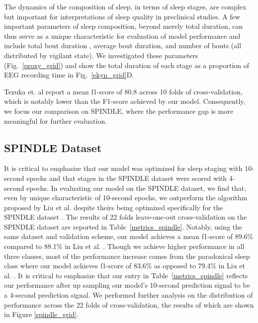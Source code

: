 \documentclass[pdflatex,sn-mathphys-num]{sn-jnl}%
\theoremstyle{thmstyleone}%
\theoremstyle{thmstyletwo}%
\theoremstyle{thmstylethree}%
\newcommand{\liuf}{88.1}
\newcommand{\liufp}{79.4}
\newcommand{\spindlefscore}{89.6}
\newcommand{\spindlefscorep}{83.6}
\begin{document}
The dynamics of the composition of sleep, in terms of sleep stages, are complex but important for interpretations of sleep quality in preclinical studies. A few important parameters of sleep composition, beyond merely total duration, can thus serve as a unique characteristic for evaluation of model performance and include total bout duration , average bout duration, and number of bouts (all distributed by vigilant state). We investigated these parameters (Fig.~\ref{proxy_grid}) and show the total duration of each stage as a proportion of EEG recording time in Fig.~\ref{ekyn_grid}D.  

Tezuka et. al \cite{tezuka_real-time_2021} report a mean f1-score of 80.8 across 10 folds of cross-validation, which is notably lower than the F1-score achieved by our model. Consequently, we focus our comparison on SPINDLE, where the performance gap is more meaningful for further evaluation.

\subsection*{SPINDLE Dataset}
It is critical to emphasize that our model was optimized for sleep staging with 10-second epochs and that stages in the SPINDLE dataset were scored with 4-second epochs. In evaluating our model on the SPINDLE dataset, we find that, even by unique characteristic of 10-second epochs, we outperform the algorithm proposed by Liu et al. \cite{liu_attention-based_2022} despite theirs being optimized specifically for the SPINDLE dataset .
The results of 22 folds leave-one-out cross-validation on the SPINDLE dataset are reported in Table~\ref{metrics_spindle}. Notably, using the same dataset and validation scheme, our model achieves a mean f1-score of \spindlefscore\% compared to \liuf\% in Liu et al. \cite{liu_attention-based_2022}. Though we achieve higher performance in all three classes, most of the performance increase comes from the paradoxical sleep class where our model achieves f1-score of \spindlefscorep\% as opposed to \liufp\% in Liu et al. \cite{liu_attention-based_2022}. It is critical to emphasize that our entry in Table~\ref{metrics_spindle} reflects our performance after up sampling our model's 10-second prediction signal to be a 4-second prediction signal.
We performed further analysis on the distribution of performance across the 22 folds of cross-validation, the results of which are shown in Figure \ref{spindle_grid}.
\end{document}
